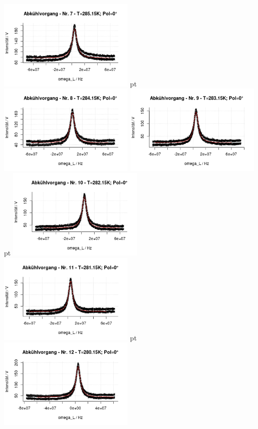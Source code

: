 \documentclass[12pt]{article}
\begin{document}
\begin{minipage}[h!]{\textwidth}
	\centering
	\includegraphics[width=0.49\textwidth]{figures/cold0-7.png} pt
	\includegraphics[width=0.49\textwidth]{figures/cold0-8.png}\vskip -10pt		
		\includegraphics[width=0.49\textwidth]{figures/cold0-9.png} pt
		\includegraphics[width=0.49\textwidth]{figures/cold0-10.png}\vskip -10pt
		\includegraphics[width=0.49\textwidth]{figures/cold0-11.png} pt
		\includegraphics[width=0.49\textwidth]{figures/cold0-12.png}\vskip -10pt	
\end{minipage}\newpage
\end{document}
